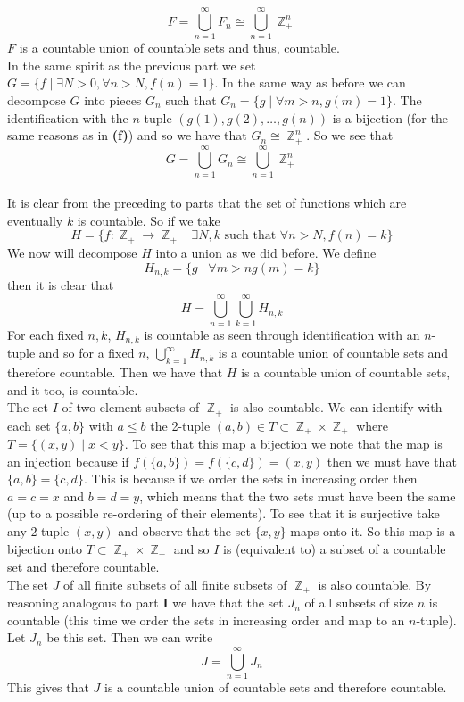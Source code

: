\documentclass{article}
\DeclareMathOperator{\Z}{\mathbb{Z}}
\DeclareMathOperator{\suchthat}{\mathrel{|}}
\newcommand{\problempart}[1]{\noindent{\textbf{(#1)}}}
\begin{document}
\[
F = \bigcup_{n=1}^\infty F_n \cong \bigcup_{n=1}^\infty \Z_+^n
\]
$F$ is a countable union of countable sets and thus, countable.\\
\problempart{g} In the same spirit as the previous part we set $G = \{f \mathrel{|} \exists N > 0, \forall n>N, f(n) = 1\}$. In the same way as before we can decompose $G$ into pieces $G_n$ such that $G_n = \{g\mathrel{|} \forall m > n, g(m) = 1\}$. The identification with the $n$-tuple $(g(1),g(2),\ldots, g(n))$ is a bijection (for the same reasons as in {\bf (f)}) and so we have that $G_n \cong \Z_+^n$. So we see that 
\[
G = \bigcup_{n=1}^\infty G_n \cong \bigcup_{n=1}^\infty \Z_+^n
\]\\
\problempart{h} It is clear from the preceding to parts that the set of functions which are eventually $k$ is countable. So if we take 
\[
H = \{f: \Z_+ \to \Z_+ \mathrel{|} \exists N,k \text{ such that } \forall n > N, f(n) = k\}
\]
We now will decompose $H$ into a union as we did before. We define
\[
H_{n,k} = \{g \suchthat \forall m > n g(m) = k\}
\]
then it is clear that 
\[
H = \bigcup_{n=1}^\infty\bigcup_{k=1}^\infty H_{n,k}
\]
For each fixed $n,k$, $H_{n,k}$ is countable as seen through identification with an $n$-tuple and so for a fixed $n$, $\bigcup_{k=1}^\infty H_{n,k}$ is a countable union of countable sets and therefore countable. Then we have that $H$ is a countable union of countable sets, and it too, is countable. \\
\problempart{i} The set $I$ of two element subsets of $\Z_+$ is also countable. We can identify with each set $\{a,b\}$ with $a \leq b$ the 2-tuple $(a,b) \in T \subset \Z_+ \times \Z_+$ where $T = \{(x,y) \suchthat x < y\}$. To see that this map a bijection we note that the map is an injection because if $f(\{a,b\}) = f(\{c,d\}) = (x,y)$ then we must have that $\{a,b\} = \{c,d\}$. This is because if we order the sets in increasing order then $a = c = x$ and $b = d = y$, which means that the two sets must have been the same (up to a possible re-ordering of their elements). To see that it is surjective take any $2$-tuple $(x,y)$ and observe that the set $\{x,y\}$ maps onto it. So this map is a bijection onto $T \subset \Z_+ \times \Z_+$ and so $I$ is (equivalent to) a subset of a countable set and therefore countable. \\
\problempart{j} The set $J$ of all finite subsets of all finite subsets of $\Z_+$ is also countable. By reasoning analogous to part {\bf I} we have that the set $J_n$ of all subsets of size $n$ is countable (this time we order the sets in increasing order and map to an $n$-tuple). Let $J_n$ be this set. Then we can write 
\[
J = \bigcup_{n=1}^\infty J_n
\]
This gives that $J$ is a countable union of countable sets and therefore countable. \\
\end{document}
